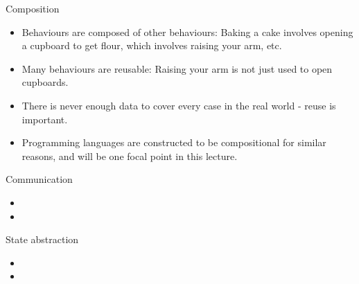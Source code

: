 
\begin{frame}{Composition}
\begin{itemize}
    \item Behaviours are composed of other behaviours: Baking a cake involves opening a cupboard to get flour, which involves raising your arm, etc.
    \item Many behaviours are reusable: Raising your arm is not just used to open cupboards.
    \item There is never enough data to cover every case in the real world - reuse is important.
    \item Programming languages are constructed to be compositional for similar reasons, and will be one focal point in this lecture.
\end{itemize}
\end{frame}

\note[itemize]{
    \item 
}

\begin{frame}{Communication}
\begin{itemize}
    \item 
    \item 
\end{itemize}
\end{frame}

\begin{frame}{State abstraction}
    \begin{itemize}
        \item 
        \item 
    \end{itemize}
\end{frame}

